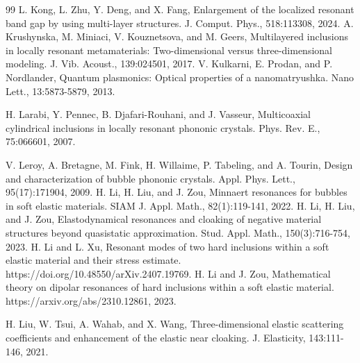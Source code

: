 \documentclass[10pt,reqno,oneside]{amsart}%
\theoremstyle{definition}
\theoremstyle{remark}
\numberwithin{equation}{section}
\numberwithin{equation}{section}
\begin{document}
\begin{thebibliography}{99}
L. Kong, L. Zhu, Y. Deng, and X. Fang, Enlargement of the localized resonant band gap by using multi-layer structures. J. Comput. Phys., 518:113308, 2024.
A. Krushynska, M. Miniaci, V. Kouznetsova, and M. Geers, Multilayered inclusions in locally resonant metamaterials: Two-dimensional versus three-dimensional modeling. J. Vib. Acoust., 139:024501, 2017.
V. Kulkarni, E. Prodan, and P. Nordlander, Quantum plasmonics: Optical properties of a nanomatryushka. Nano Lett., 13:5873-5879, 2013.


H. Larabi, Y. Pennec, B. Djafari-Rouhani, and J. Vasseur, Multicoaxial cylindrical inclusions in locally resonant
phononic crystals. Phys. Rev. E., 75:066601, 2007.

V. Leroy, A. Bretagne, M. Fink, H. Willaime, P. Tabeling, and A. Tourin, Design and characterization of bubble phononic crystals. Appl. Phys. Lett., 95(17):171904, 2009.
H. Li, H. Liu, and J. Zou, Minnaert resonances for bubbles in soft elastic materials. SIAM J. Appl. Math., 82(1):119-141, 2022.
H. Li, H. Liu, and J. Zou, Elastodynamical resonances and cloaking of negative material structures beyond
quasistatic approximation. Stud. Appl. Math., 150(3):716-754, 2023.
H. Li and L. Xu, Resonant modes of two hard inclusions within a soft elastic material and their stress estimate. https://doi.org/10.48550/arXiv.2407.19769.
H. Li and J. Zou, Mathematical theory on dipolar resonances of hard inclusions within a soft elastic material. https://arxiv.org/abs/2310.12861, 2023.

H. Liu, W. Tsui, A. Wahab, and X. Wang, Three-dimensional elastic scattering coefficients and enhancement
of the elastic near cloaking. J. Elasticity, 143:111-146, 2021.





\end{thebibliography}
\end{document}
